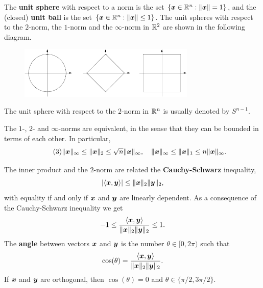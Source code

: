 The \textbf{unit sphere} with respect to a norm is the set $\{\bm{x}\in \mathbb{R}^n \mathrel{\mathop{:}} \Vert {\bm{x}}\Vert=1\}$, and the (closed) \textbf{unit ball} is the set $\{\bm{x}\in \mathbb{R}^n \mathrel{\mathop{:}} \Vert {\bm{x}}\Vert\leq 1\}$. The unit spheres with respect to the $2$-norm, the $1$-norm and the $\infty$-norm in $\mathbb{R}^2$ are shown in the following diagram.
\begin{center}
\begin{figure}[h]
\centering
\includegraphics[width=0.75\textwidth]{images/norms.pdf}
\end{figure}
\end{center}
The unit sphere with respect to the $2$-norm in $\mathbb{R}^n$ is usually denoted by $S^{n-1}$.

The $1$-, $2$- and $\infty$-norms are equivalent, in the sense that they can be bounded in terms of each other. In particular,
\begin{equation}\label{eq:normineq}\tag{3}
 \Vert {\bm{x}}\Vert_\infty \leq \Vert {\bm{x}}\Vert_2\leq \sqrt{n}\Vert {\bm{x}}\Vert_\infty, \quad \Vert {\bm{x}}\Vert_\infty \leq \Vert {\bm{x}}\Vert_1\leq n\Vert {\bm{x}}\Vert_\infty.
\end{equation}

The inner product and the $2$-norm are related the \textbf{Cauchy-Schwarz} inequality,
\begin{equation*}
 |\langle {\bm{x}}, {\bm{y}} \rangle| \leq \Vert {\bm{x}}\Vert_2\Vert {\bm{y}}\Vert_2,
\end{equation*}
with equality if and only if $\bm{x}$ and $\bm{y}$ are linearly dependent. As a consequence of the Cauchy-Schwarz inequality we get
\begin{equation*}
 -1\leq \frac{\langle {\bm{x}}, {\bm{y}} \rangle}{\Vert {\bm{x}}\Vert_2\Vert {\bm{y}}\Vert_2}\leq 1.
\end{equation*}
The \strictpagecheck{}\textbf{angle} between vectors $\bm{x}$ and $\bm{y}$ is the number $\theta\in [0,2\pi)$ such that
\begin{equation*}
 \cos(\theta) = \frac{\langle {\bm{x}}, {\bm{y}} \rangle}{\Vert {\bm{x}}\Vert_2\Vert {\bm{y}}\Vert_2}.
\end{equation*}
If $\bm{x}$ and $\bm{y}$ are orthogonal, then $\cos(\theta)=0$ and $\theta\in \{\pi/2,3\pi/2\}$.

